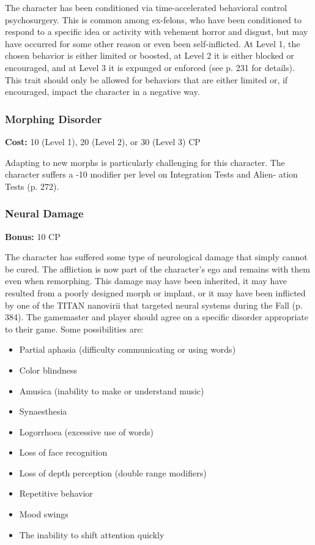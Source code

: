The character has been conditioned via time-accelerated behavioral control
psychosurgery. This is common among ex-felons, who have been conditioned to
respond to a specific idea or activity with vehement horror and disgust, but
may have occurred for some other reason or even been self-inflicted. At Level
1, the chosen behavior is either limited or boosted, at Level 2 it is either
blocked or encouraged, and at Level 3 it is expunged or enforced (see p. 231
for details). This trait should only be allowed for behaviors that are either
limited or, if encouraged, impact the character in a negative way.

\subsubsection{Morphing Disorder}
\textbf{Cost:} 10 (Level 1), 20 (Level 2), or 30 (Level 3) CP

Adapting to new morphs is particularly challenging for this character. The
character suffers a -10 modifier per level on Integration Tests and Alien-
ation Tests (p. 272).

\subsubsection{Neural Damage}
\textbf{Bonus:} 10 CP

The character has suffered some type of neurological damage that simply
cannot be cured. The affliction is now part of the character’s ego and remains
with them even when remorphing. This damage may have been inherited, it may
have resulted from a poorly designed morph or implant, or it may have been
inflicted by one of the TITAN nanovirii that targeted neural systems during the
Fall (p. 384). The gamemaster and player should agree on a specific disorder
appropriate to their game. Some possibilities are:

\begin{itemize}
\item Partial aphasia (difficulty communicating or using words)
\item Color blindness
\item Amusica (inability to make or understand music)
\item Synaesthesia
\item Logorrhoea (excessive use of words)
\item Loss of face recognition
\item Loss of depth perception (double range modifiers)
\item Repetitive behavior
\item Mood swings
\item The inability to shift attention quickly
\end{itemize}


